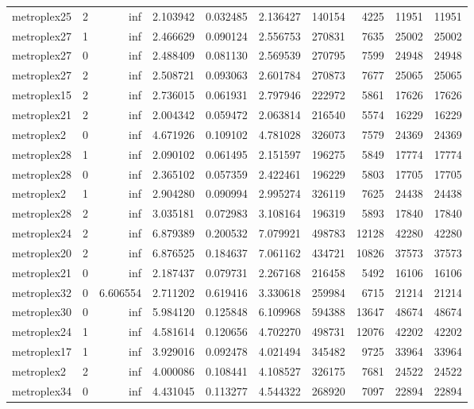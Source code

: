 \begin{longtable}{|l|r|r|r|r|r|r|r|r|r|}
metroplex25 & 2 & inf & 2.103942 & 0.032485 & 2.136427 & 140154 & 4225 & 11951 & 11951 \\
metroplex27 & 1 & inf & 2.466629 & 0.090124 & 2.556753 & 270831 & 7635 & 25002 & 25002 \\
metroplex27 & 0 & inf & 2.488409 & 0.081130 & 2.569539 & 270795 & 7599 & 24948 & 24948 \\
metroplex27 & 2 & inf & 2.508721 & 0.093063 & 2.601784 & 270873 & 7677 & 25065 & 25065 \\
metroplex15 & 2 & inf & 2.736015 & 0.061931 & 2.797946 & 222972 & 5861 & 17626 & 17626 \\
metroplex21 & 2 & inf & 2.004342 & 0.059472 & 2.063814 & 216540 & 5574 & 16229 & 16229 \\
metroplex2 & 0 & inf & 4.671926 & 0.109102 & 4.781028 & 326073 & 7579 & 24369 & 24369 \\
metroplex28 & 1 & inf & 2.090102 & 0.061495 & 2.151597 & 196275 & 5849 & 17774 & 17774 \\
metroplex28 & 0 & inf & 2.365102 & 0.057359 & 2.422461 & 196229 & 5803 & 17705 & 17705 \\
metroplex2 & 1 & inf & 2.904280 & 0.090994 & 2.995274 & 326119 & 7625 & 24438 & 24438 \\
metroplex28 & 2 & inf & 3.035181 & 0.072983 & 3.108164 & 196319 & 5893 & 17840 & 17840 \\
metroplex24 & 2 & inf & 6.879389 & 0.200532 & 7.079921 & 498783 & 12128 & 42280 & 42280 \\
metroplex20 & 2 & inf & 6.876525 & 0.184637 & 7.061162 & 434721 & 10826 & 37573 & 37573 \\
metroplex21 & 0 & inf & 2.187437 & 0.079731 & 2.267168 & 216458 & 5492 & 16106 & 16106 \\
metroplex32 & 0 & 6.606554 & 2.711202 & 0.619416 & 3.330618 & 259984 & 6715 & 21214 & 21214 \\
metroplex30 & 0 & inf & 5.984120 & 0.125848 & 6.109968 & 594388 & 13647 & 48674 & 48674 \\
metroplex24 & 1 & inf & 4.581614 & 0.120656 & 4.702270 & 498731 & 12076 & 42202 & 42202 \\
metroplex17 & 1 & inf & 3.929016 & 0.092478 & 4.021494 & 345482 & 9725 & 33964 & 33964 \\
metroplex2 & 2 & inf & 4.000086 & 0.108441 & 4.108527 & 326175 & 7681 & 24522 & 24522 \\
metroplex34 & 0 & inf & 4.431045 & 0.113277 & 4.544322 & 268920 & 7097 & 22894 & 22894 \\

\end{longtable}
